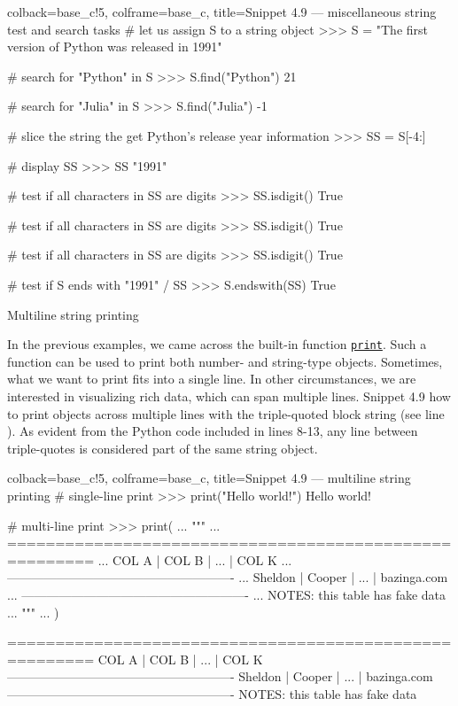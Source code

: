 \documentclass[a4paper,11pt]{book}
\numberwithin{figure}{chapter}
\numberwithin{table}{chapter}
\newcommand{\question}[1]{%
    \begin{tcolorbox}[colback=comp_c!10,colframe=comp_c,sidebyside align=top,width=\linewidth,before skip=1ex]
        #1
    \end{tcolorbox}
    \switchcolumn%
}
\newcommand{\note}[1]{%
    \begin{tcolorbox}[colback=white!0,colframe=white!10,width=\linewidth,before skip=1ex]
        #1
    \end{tcolorbox}
}
\begin{document}
\begin{pythoncode}[linenos=true,]{colback=base_c!5, colframe=base_c, title=\sffamily Snippet 4.9 --- miscellaneous string test and search tasks}
# let us assign S to a string object
>>> S = "The first version of Python was released in 1991"

# search for "Python" in S
>>> S.find("Python")
21

# search for "Julia" in S
>>> S.find("Julia")
-1

# slice the string the get Python's release year information
>>> SS = S[-4:]

# display SS
>>> SS
"1991"

# test if all characters in SS are digits
>>> SS.isdigit()
True

# test if all characters in SS are digits
>>> SS.isdigit()
True

# test if all characters in SS are digits
>>> SS.isdigit()
True

# test if S ends with "1991" / SS
>>> S.endswith(SS)
True
\end{pythoncode}
\clearpage

\begin{paracol}{2}
\question{\raggedright Multiline string printing}
\note{In the previous examples, we came across the built-in function \href{https://docs.python.org/3/library/functions.html\#print}{\texttt{print}}. Such a function can be used to print both number- and string-type objects. Sometimes, what we want to print fits into a single line. In other circumstances, we are interested in visualizing rich data, which can span multiple lines. Snippet 4.9 how to print objects across multiple lines with the triple-quoted block string (see line ). As evident from the Python code included in lines 8-13, any line between triple-quotes is considered part of the same string object.}	
\end{paracol}

\begin{pythoncode}[linenos=true,]{colback=base_c!5, colframe=base_c, title=\sffamily Snippet 4.9 --- multiline string printing}
# single-line print
>>> print("Hello world!")
Hello world!

# multi-line print
>>> print(
... """
... =======================================================
... COL A       | COL B      | ...        | COL K
... -------------------------------------------------------
... Sheldon     | Cooper     | ...        | bazinga.com
... -------------------------------------------------------
... NOTES: this table has fake data
... """
... )

=======================================================
COL A       | COL B      | ...        | COL K
-------------------------------------------------------
Sheldon     | Cooper     | ...        | bazinga.com
-------------------------------------------------------
NOTES: this table has fake data

\end{pythoncode}
\end{document}
